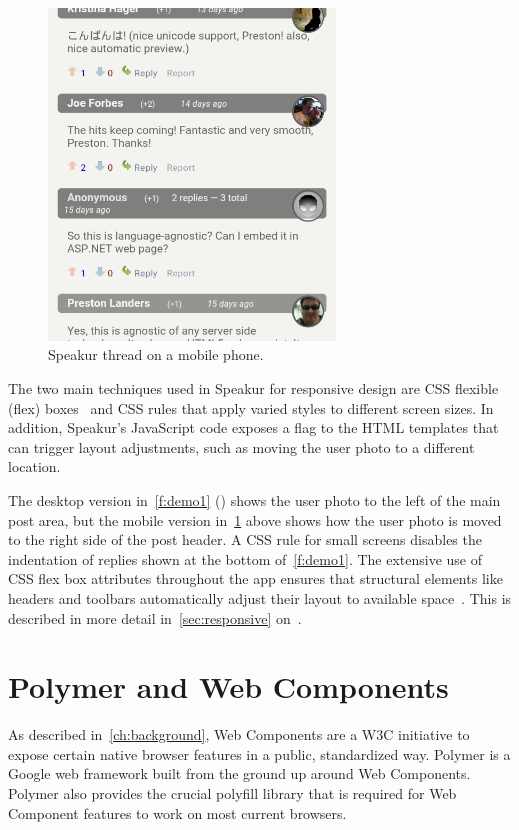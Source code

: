 \begin{figure}[htb]
\centering
 \includegraphics[width=3in]{images/mobile2.png}
\caption{Speakur thread on a mobile phone.}
\label{f:mobile1}
\end{figure}

The two main techniques used in Speakur for responsive design are CSS flexible (flex) boxes~\cite{mozillacontributors2015} 
and CSS  rules that apply varied styles to different screen sizes. 
In addition, Speakur's JavaScript code exposes a  flag to the HTML templates that can trigger layout adjustments, 
such as moving the user photo to a different location.

The desktop version in~\cref{f:demo1} () shows the user photo to the left of the main post area, 
but the mobile version in~\cref{f:mobile1} above shows how the user photo is moved to the right side of the post header. 
A CSS  rule for small screens disables the indentation of replies shown at the bottom of~\cref{f:demo1}. 
The extensive use of CSS flex box attributes throughout the app ensures that structural elements like headers and toolbars automatically adjust their layout to available space~\cite{polymercontributors2015-d}. 
This is described in more detail in~\cref{sec:responsive} on~.

\section{Polymer and Web Components}
As described in~\cref{ch:background}, 
Web Components are a 
W3C initiative 
to expose certain native browser features in a public, standardized way. 
Polymer is a 
Google 
web framework built from the ground up around Web Components.
Polymer also provides the crucial 
polyfill library 
that is required for Web Component features to work on most current browsers.

